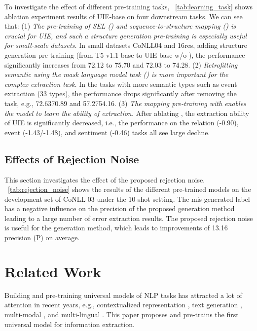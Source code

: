 \documentclass[11pt]{article}
\begin{document}
To investigate the effect of different pre-training tasks, \tablename~\ref{tab:learning_task} shows ablation experiment results of UIE-base on four downstream tasks.
We can see that:
(1)
\textit{The pre-training of SEL () and sequence-to-structure mapping () is crucial for UIE, and such a structure generation pre-training is especially useful for small-scale datasets.}
In small datasets CoNLL04 and 16res, adding structure generation pre-training (from T5-v1.1-base to UIE-base w/o ), the performance significantly increases from 72.12 to 75.70 and 72.03 to 74.28.
(2)
\textit{Retrofitting semantic using the mask language model task () is more important for the complex extraction task.}
In the tasks with more semantic types such as event extraction (33 types), the performance drops significantly after removing the  task, e.g., 72.6370.89 and 57.2754.16.
(3) 
\textit{The mapping pre-training with  enables the model to learn the ability of extraction.}
After ablating , the extraction ability of UIE is significantly decreased, i.e., the performance on the relation (-0.90), event (-1.43/-1.48), and sentiment (-0.46) tasks all see large decline.

\subsection{Effects of Rejection Noise}

This section investigates the effect of the proposed rejection noise.
\tablename~\ref{tab:rejection_noise} shows the results of the different pre-trained models on the development set of CoNLL 03 under the 10-shot setting.
The mis-generated label has a negative influence on the precision of the proposed generation method leading to a large number of error extraction results.
The proposed rejection noise is useful for the generation method, which leads to improvements of 13.16 precision (P) on average.
 
\section{Related Work} \label{section:related_work}
Building and pre-training universal models of NLP tasks has attracted a lot of attention in recent years, e.g., contextualized representation \citep{devlin-etal-2019-bert, roberta}, text generation \citep{lewis-etal-2020-bart,2020t5}, multi-modal \citep{li-etal-2021-unimo,pmlr-v139-cho21a}, and multi-lingual \citep{conneau-etal-2020-unsupervised,xue-etal-2021-mt5}.
This paper proposes and pre-trains the first universal model for information extraction.
\end{document}
